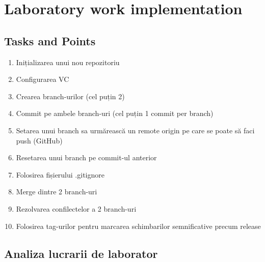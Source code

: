 \section{Laboratory work implementation}

\subsection{Tasks and Points}

\begin{enumerate}
\item Inițializarea unui nou repozitoriu
\item Configurarea VC
\item Crearea branch-urilor (cel puțin 2)
\item Commit pe ambele branch-uri (cel puțin 1 commit per branch)
\item Setarea unui branch sa urmărească un remote origin pe care se poate să faci push (GitHub)
\item Resetarea unui branch pe commit-ul anterior
\item Folosirea fișierului .gitignore
\item Merge dintre 2 branch-uri
\item Rezolvarea confilectelor a 2 branch-uri
\item Folosirea tag-urilor pentru marcarea schimbarilor semnificative precum release
\end{enumerate}

\subsection{Analiza lucrarii de laborator}

